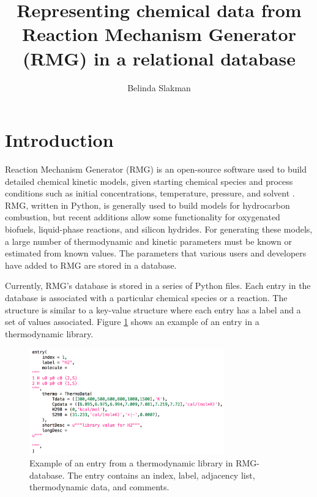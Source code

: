\documentclass[11pt]{article}
\title{Representing chemical data from Reaction Mechanism Generator (RMG) in a relational database}
\author{Belinda Slakman}
\begin{document}
\maketitle

\section{Introduction}

Reaction Mechanism Generator (RMG) is an open-source software used to build detailed chemical kinetic models, given starting chemical species and process conditions such as initial concentrations, temperature, pressure, and solvent \cite{RMGPy}. RMG, written in Python, is generally used to build models for hydrocarbon combustion, but recent additions allow some functionality for oxygenated biofuels, liquid-phase reactions, and silicon hydrides. For generating these models, a large number of thermodynamic and kinetic parameters must be known or estimated from known values. The parameters that various users and developers have added to RMG are stored in a database.

Currently, RMG's database is stored in a series of Python files. Each entry in the database is associated with a particular chemical species or a reaction. The structure is similar to a key-value structure where each entry has a label and a set of values associated. Figure \ref{fig:thermo_entry} shows an example of an entry in a thermodynamic library.

\begin{figure}[h]
\centering
\includegraphics[width=0.75\textwidth]{thermo_entry.pdf}
\caption{\label{fig:thermo_entry} Example of an entry from a thermodynamic library in RMG-database. The entry contains an index, label, adjacency list, thermodynamic data, and comments.}
\end{figure}
\end{document}
